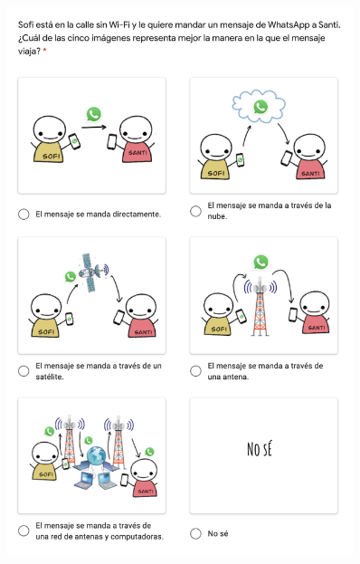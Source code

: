 \begin{figure}[H]    
    \includegraphics[width=0.9\textwidth]{imagenes_anexo/o.png}
\end{figure}

